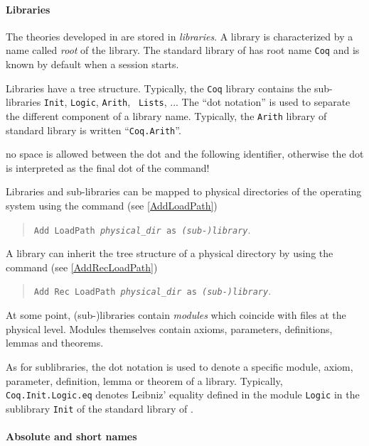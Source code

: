 {\begin{coq_example}
\paragraph{Libraries}

The theories developed in {\Coq} are stored in {\em libraries}.  A
library is characterized by a name called {\it root} of the
library. The standard library of {\Coq} has root name {\tt Coq} and is
known by default when a {\Coq} session starts.

Libraries have a tree structure. Typically, the {\tt Coq} library
contains the sub-libraries {\tt Init}, {\tt Logic}, {\tt Arith}, {\tt
Lists}, ... The ``dot notation'' is used to separate the different
component of a library name. Typically, the {\tt Arith} library of
{\Coq} standard library is written ``{\tt Coq.Arith}''.

\medskip
\Rem no space is allowed between the dot and the following
identifier, otherwise the dot is interpreted as the final dot of the
command!
\medskip

Libraries and sub-libraries can be mapped to physical directories of the
operating system using the command (see \ref{AddLoadPath})

\begin{quote}
{\tt Add LoadPath {\it physical\_dir} as {\it (sub-)library}}.
\end{quote}

A library can inherit the tree structure of a physical directory by
using the command  (see \ref{AddRecLoadPath})

\begin{quote}
{\tt Add Rec LoadPath {\it physical\_dir} as {\it (sub-)library}}.
\end{quote}

At some point, (sub-)libraries contain {\it modules} which coincide
with files at the physical level. Modules themselves contain
axioms, parameters, definitions, lemmas and theorems.

As for sublibraries, the dot notation is used to denote a specific
module, axiom, parameter, definition, lemma or theorem of a
library. Typically, {\tt Coq.Init.Logic.eq} denotes Leibniz' equality
defined in the module {\tt Logic} in the sublibrary {\tt Init} of the
standard library of \Coq.

\paragraph{Absolute and short names}


\end{coq_example}}
